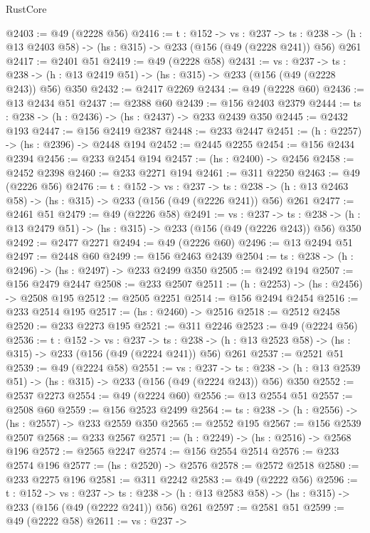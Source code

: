 \begin{lexlean}{RustCore}
\begin{coremodule}
@2403 := @49 (@2228 @56)
@2416 := {t : @152} ->
  {vs : @237} ->
  {ts : @238} -> (h : @13 @2403 @58) -> (hs : @315) -> @233 (@156 (@49 (@2228 @241)) @56) @261
@2417 := @2401 @51
@2419 := @49 (@2228 @58)
@2431 := {vs : @237} ->
  {ts : @238} -> (h : @13 @2419 @51) -> (hs : @315) -> @233 (@156 (@49 (@2228 @243)) @56) @350
@2432 := @2417 @2269
@2434 := @49 (@2228 @60)
@2436 := @13 @2434 @51
@2437 := @2388 @60
@2439 := @156 @2403 @2379
@2444 := {ts : @238} -> (h : @2436) -> (hs : @2437) -> @233 @2439 @350
@2445 := @2432 @193
@2447 := @156 @2419 @2387
@2448 := @233 @2447
@2451 := (h : @2257) -> (hs : @2396) -> @2448 @194
@2452 := @2445 @2255
@2454 := @156 @2434 @2394
@2456 := @233 @2454 @194
@2457 := (hs : @2400) -> @2456
@2458 := @2452 @2398
@2460 := @233 @2271 @194
@2461 := @311 @2250
@2463 := @49 (@2226 @56)
@2476 := {t : @152} ->
  {vs : @237} ->
  {ts : @238} -> (h : @13 @2463 @58) -> (hs : @315) -> @233 (@156 (@49 (@2226 @241)) @56) @261
@2477 := @2461 @51
@2479 := @49 (@2226 @58)
@2491 := {vs : @237} ->
  {ts : @238} -> (h : @13 @2479 @51) -> (hs : @315) -> @233 (@156 (@49 (@2226 @243)) @56) @350
@2492 := @2477 @2271
@2494 := @49 (@2226 @60)
@2496 := @13 @2494 @51
@2497 := @2448 @60
@2499 := @156 @2463 @2439
@2504 := {ts : @238} -> (h : @2496) -> (hs : @2497) -> @233 @2499 @350
@2505 := @2492 @194
@2507 := @156 @2479 @2447
@2508 := @233 @2507
@2511 := (h : @2253) -> (hs : @2456) -> @2508 @195
@2512 := @2505 @2251
@2514 := @156 @2494 @2454
@2516 := @233 @2514 @195
@2517 := (hs : @2460) -> @2516
@2518 := @2512 @2458
@2520 := @233 @2273 @195
@2521 := @311 @2246
@2523 := @49 (@2224 @56)
@2536 := {t : @152} ->
  {vs : @237} ->
  {ts : @238} -> (h : @13 @2523 @58) -> (hs : @315) -> @233 (@156 (@49 (@2224 @241)) @56) @261
@2537 := @2521 @51
@2539 := @49 (@2224 @58)
@2551 := {vs : @237} ->
  {ts : @238} -> (h : @13 @2539 @51) -> (hs : @315) -> @233 (@156 (@49 (@2224 @243)) @56) @350
@2552 := @2537 @2273
@2554 := @49 (@2224 @60)
@2556 := @13 @2554 @51
@2557 := @2508 @60
@2559 := @156 @2523 @2499
@2564 := {ts : @238} -> (h : @2556) -> (hs : @2557) -> @233 @2559 @350
@2565 := @2552 @195
@2567 := @156 @2539 @2507
@2568 := @233 @2567
@2571 := (h : @2249) -> (hs : @2516) -> @2568 @196
@2572 := @2565 @2247
@2574 := @156 @2554 @2514
@2576 := @233 @2574 @196
@2577 := (hs : @2520) -> @2576
@2578 := @2572 @2518
@2580 := @233 @2275 @196
@2581 := @311 @2242
@2583 := @49 (@2222 @56)
@2596 := {t : @152} ->
  {vs : @237} ->
  {ts : @238} -> (h : @13 @2583 @58) -> (hs : @315) -> @233 (@156 (@49 (@2222 @241)) @56) @261
@2597 := @2581 @51
@2599 := @49 (@2222 @58)
@2611 := {vs : @237} ->

\end{coremodule}
\end{lexlean}
